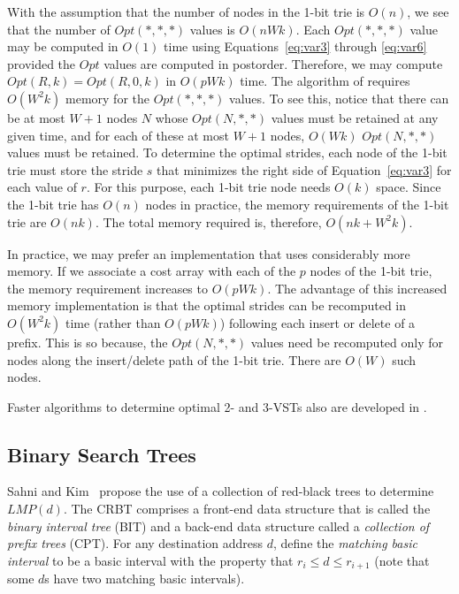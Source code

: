 With the assumption that the number of nodes in the 1-bit trie is $O(n)$,
we see that
the number of $Opt(*,*,*)$ values is $O(nWk)$.  Each
$Opt(*,*,*)$ value may be computed in
$O(1)$ time using Equations~\ref{eq:var3} through \ref{eq:var6} provided
the $Opt$ values are computed in postorder.
Therefore, we may compute $Opt(R,k) = Opt(R,0,k)$ in $O(pWk)$ time.
The algorithm of \cite{sahni2}
requires $O(W^2k)$ memory for the $Opt(*,*,*)$ values.
To see this, notice that there can be at most $W+1$ nodes $N$ whose
$Opt(N,*,*)$ values must be retained at any given time, and for each
of these at most $W+1$ nodes, $O(Wk)$ $Opt(N,*,*)$ values must be retained.
To determine the optimal strides, each
node of the 1-bit trie must store the
stride $s$ that minimizes the right side of Equation~\ref{eq:var3}
for each value of $r$. For this purpose, each 1-bit trie node
needs $O(k)$ space. Since the 1-bit trie has $O(n)$ nodes in practice,
the memory requirements of the 1-bit trie are $O(nk)$.
The total memory required is, therefore, $O(nk + W^2k)$.

In practice, we may prefer an implementation that uses considerably
more memory. If we associate a cost array with each of the $p$
nodes of the 1-bit trie, the memory requirement increases to
$O(pWk)$. The advantage of this increased memory implementation
is that the optimal strides can be recomputed in $O(W^2k)$ time
(rather than $O(pWk)$) following
each insert or delete of a prefix. This is so because, the
$Opt(N,*,*)$ values need be recomputed only for nodes
along the insert/delete path of the 1-bit trie. There are $O(W)$ such nodes.

Faster algorithms to determine optimal 2- and 3-VSTs also are developed in
\cite{sahni2}.

\subsection{Binary Search Trees}
Sahni and Kim~\cite{sahni3} propose the use of a collection
of red-black trees to determine $LMP(d)$. The CRBT comprises a front-end
data structure that is called the {\em binary interval tree} (BIT) and
a back-end data structure called a {\em collection of prefix trees} (CPT).
For any destination address $d$, define the {\em matching basic interval}
to be a basic interval with the property that $r_i \leq d \leq r_{i+1}$
(note that some $d$s have two matching basic intervals).

